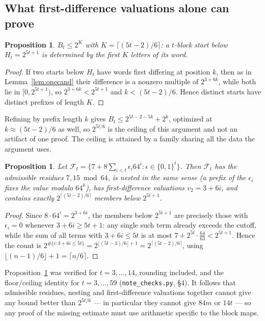 \documentclass[11pt,a4paper]{article}
\theoremstyle{plain}
\newtheorem{proposition}[theorem]{Proposition}
\theoremstyle{definition}
\theoremstyle{remark}
\begin{document}
\subsection{What first-difference valuations alone can prove}

\begin{proposition}\label{prop:valbound}
$B_t\le 2^{K}$ with $K=\lceil (5t-2)/6\rceil$: a $t$-block start below
$H_t=2^{5t+1}$ is determined by the first $K$ letters of its word.
\end{proposition}

\begin{proof}
If two starts below $H_t$ have words first differing at position $k$, then as
in Lemma~\ref{lem:onecand} their difference is a nonzero multiple of
$2^{3+6k}$, while both lie in $[0,2^{5t+1})$, so $2^{3+6k}<2^{5t+1}$ and
$k<(5t-2)/6$. Hence distinct starts have distinct prefixes of length $K$.
\end{proof}

Refining by prefix length $k$ gives $B_t\le 2^{5t-2-5k}+2^{k}$, optimized at
$k\approx(5t-2)/6$ as well, so $2^{5t/6}$ is the ceiling of this argument and
not an artifact of one proof. The ceiling is attained by a family sharing all
the data the argument uses.

\begin{proposition}\label{prop:family}
Let $\mathcal{F}_t=\{7+8\sum_{i<t}\epsilon_i 64^{i}:\epsilon\in\{0,1\}^t\}$.
Then $\mathcal{F}_t$ has the admissible residues $7,15\bmod 64$, is nested in
the same sense (a prefix of the $\epsilon_i$ fixes the value modulo $64^k$),
has first-difference valuations $v_2=3+6i$, and contains exactly
$2^{\lceil (5t-2)/6\rceil}$ members below $2^{5t+1}$.
\end{proposition}

\begin{proof}
Since $8\cdot 64^{i}=2^{3+6i}$, the members below $2^{5t+1}$ are precisely
those with $\epsilon_i=0$ whenever $3+6i\ge 5t+1$: any single such term already
exceeds the cutoff, while the sum of all terms with $3+6i\le 5t$ is at most
$7+2^{5t}\cdot\frac{64}{63}<2^{5t+1}$. Hence the count is
$2^{\#\{i:3+6i\le 5t\}}=2^{\lfloor (5t-3)/6\rfloor+1}=2^{\lceil (5t-2)/6\rceil}$,
using $\lfloor (n-1)/6\rfloor+1=\lceil n/6\rceil$.
\end{proof}

Proposition~\ref{prop:family} was verified for $t=3,\dots,14$, rounding
included, and the floor/ceiling identity for $t=3,\dots,59$
(\texttt{note\_checks.py}, \S4). It follows that admissible residues, nesting
and first-difference valuations together cannot give any bound better than
$2^{5t/6}$ --- in particular they cannot give $84m$ or $14t$ --- so any proof of
the missing estimate must use arithmetic specific to the block maps.
\end{document}
